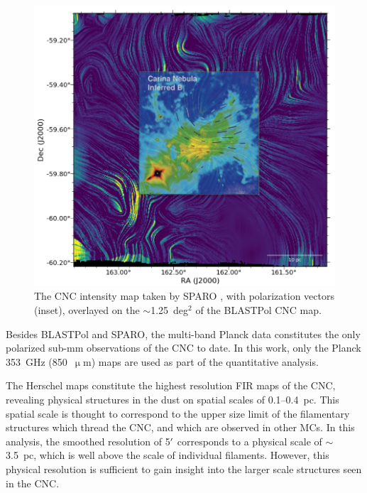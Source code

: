 \begin{figure}[!htbp]
\centering
\includegraphics[width=\textwidth]{figures/carina/lic_sparo_overlay}
\caption[~The CNC intensity map taken by SPARO overlayed on the  of the BLASTPol CNC map.]{The CNC intensity map taken by SPARO \citep{li2006results}, with polarization vectors (inset), overlayed on the $\sim$1.25~deg$^{2}$ of the BLASTPol CNC map.}
\label{fig:lic_sparo_overlay}
\end{figure}

Besides BLASTPol and SPARO, the multi-band Planck data constitutes the only polarized sub-mm observations of the CNC to date. In this work, only the Planck 353~GHz (850~$\upmu$m) maps are used as part of the quantitative analysis.

The Herschel maps constitute the highest resolution FIR maps of the CNC, revealing physical structures in the dust on spatial scales of 0.1--0.4~pc. This spatial scale is thought to correspond to the upper size limit of the filamentary structures which thread the CNC, and which are observed in other MCs. In this analysis, the smoothed resolution of 5$\operatorname{^{\prime}}$ corresponds to a physical scale of $\sim$3.5~pc, which is well above the scale of individual filaments. However, this physical resolution is sufficient to gain insight into the larger scale structures seen in the CNC\@.

